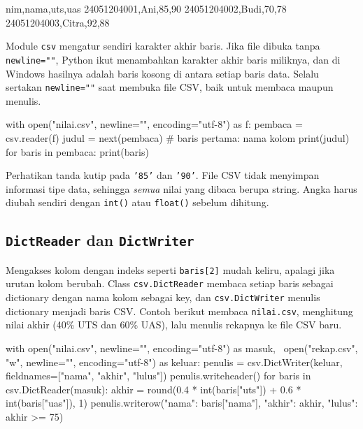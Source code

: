 \begin{keluaran}
nim,nama,uts,uas
24051204001,Ani,85,90
24051204002,Budi,70,78
24051204003,Citra,92,88
\end{keluaran}

\begin{info}[Argumen \texttt{newline=""}]
Module \texttt{csv} mengatur sendiri karakter akhir baris. Jika file dibuka tanpa \texttt{newline=""}, Python ikut menambahkan karakter akhir baris miliknya, dan di Windows hasilnya adalah baris kosong di antara setiap baris data. Selalu sertakan \texttt{newline=""} saat membuka file CSV, baik untuk membaca maupun menulis.
\end{info}

\begin{kode}
with open("nilai.csv", newline="", encoding="utf-8") as f:
    pembaca = csv.reader(f)
    judul = next(pembaca)                    # baris pertama: nama kolom
    print(judul)
    for baris in pembaca:
        print(baris)
\end{kode}

\begin{keluaran}
\end{keluaran}

Perhatikan tanda kutip pada \texttt{'85'} dan \texttt{'90'}. File CSV tidak menyimpan informasi tipe data, sehingga \emph{semua} nilai yang dibaca berupa string. Angka harus diubah sendiri dengan \texttt{int()} atau \texttt{float()} sebelum dihitung.

\subsection{\texttt{DictReader} dan \texttt{DictWriter}}

Mengakses kolom dengan indeks seperti \texttt{baris[2]} mudah keliru, apalagi jika urutan kolom berubah. Class \texttt{csv.DictReader} membaca setiap baris sebagai dictionary dengan nama kolom sebagai key, dan \texttt{csv.DictWriter} menulis dictionary menjadi baris CSV. Contoh berikut membaca \texttt{nilai.csv}, menghitung nilai akhir (40\% UTS dan 60\% UAS), lalu menulis rekapnya ke file CSV baru.

\begin{kode}
with open("nilai.csv", newline="", encoding="utf-8") as masuk, \
     open("rekap.csv", "w", newline="", encoding="utf-8") as keluar:
    penulis = csv.DictWriter(keluar, fieldnames=["nama", "akhir", "lulus"])
    penulis.writeheader()
    for baris in csv.DictReader(masuk):
        akhir = round(0.4 * int(baris["uts"]) + 0.6 * int(baris["uas"]), 1)
        penulis.writerow({"nama": baris["nama"], "akhir": akhir,
                          "lulus": akhir >= 75})
\end{kode}

